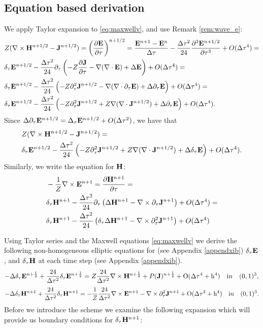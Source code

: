 \documentclass[12pt,reqno]{amsart}
\newcommand{\e}{{\bf E}}
\newcommand{\h}{{\bf H}}
\newcommand{\J}{{\bf J}}
\theoremstyle{definition}
\numberwithin{equation}{section}
\begin{document}
	\subsection{Equation based derivation}
	We apply Taylor expansion to \eqref{eq:maxwellv}, and use Remark \ref{rem:wave_e}:
	\begin{align*}
	&
	Z(\nabla \times \h^{n+1/2}-\J^{n+1/2})=	\left (  \frac{\partial \e}{\partial \tau} \right)^{n+1/2}=
		\frac{\e^{n+1} -\e^n}{\Delta \tau}-\frac{\Delta \tau^2}{24}\frac{\partial^3 \e^{n+1/2}}{\partial \tau^3}+O(\Delta \tau^4)=\\&
		\delta_{\tau}\e^{n+1/2}-\frac{\Delta \tau^2}{24}\partial_{\tau}
		\left(
		-Z\frac{\partial \J}{\partial \tau}-\nabla(\nabla \cdot \e)+\Delta \e
		\right)+O(\Delta \tau^4)=\\&
			\delta_{\tau}\e^{n+1/2}-\frac{\Delta \tau^2}{24}
		\left(
		-Z\partial_{\tau}^2\J^{n+1/2}
		-\nabla(\nabla\cdot\partial_\tau \e)+\Delta \partial_{\tau}\e
		\right)+O(\Delta \tau^4)=\\&
			\delta_{\tau}\e^{n+1/2}-\frac{\Delta \tau^2}{24}
		\left(
		-Z\partial_{\tau}^2\J^{n+1/2}
		+Z\nabla(\nabla\cdot\J^{n+1/2})+\Delta \partial_{\tau}\e
		\right)+O(\Delta \tau^4).
	\end{align*}
Since  $\Delta \partial_{\tau}\e^{n+1/2}=\Delta_{\tau} \e^{n+1/2}+O(\Delta \tau^2) $,
we have 
that 
\begin{align*}
	&
		Z(\nabla \times \h^{n+1/2}-\J^{n+1/2})=\\&
	\delta_{\tau}\e^{n+1/2}-\frac{\Delta \tau^2}{24}
\left(
-Z\partial_{\tau}^2\J^{n+1/2}
+Z\nabla(\nabla\cdot\J^{n+1/2})+\Delta \delta_{\tau}\e
\right)+O(\Delta \tau^4).
\end{align*}
Similarly, we write the equation for $\h$:
\begin{align*}
	& 
	-\frac{1}{Z}\nabla \times \e^{n+1}=\frac{\partial \h^{n+1}}{\partial \tau}=\\&
	\delta_\tau \h^{n+1}-\frac{\Delta \tau^2}{24}\partial_{\tau}\left ( 
\Delta \h^{n+1}-\nabla \times \partial_{\tau}\J^{n+1}
	\right)+O(\Delta \tau^4)=\\&
		\delta_\tau \h^{n+1}-\frac{\Delta \tau^2}{24}\left ( 
	\delta_{\tau}\Delta\h^{n+1}-\nabla \times \partial_{\tau}^2\J^{n+1}
	\right)+O(\Delta \tau^4)
\end{align*}
	
	Using  Taylor series and the Maxwell equations \eqref{eq:maxwellv} 
	we derive the following non-homogeneous elliptic equations for (see Appendix \ref{appendxib})
$	\delta_{\tau} \bf{E}$, and $\delta_{\tau} \bf{H}$
at each time step
(see Appendix \ref{appendxib}).
	$$
	-\Delta\delta_{\tau} \e^{n+\frac{1}{2}}+\frac{24}{\Delta \tau^2}\delta_{\tau}\e^{n+\frac{1}{2}}=
	Z\frac{24}{\Delta \tau^2}\nabla\times \h^{n+\frac{1}{2}}+P(\J)^{n+\frac{1}{2}}+
	\mathrm{O(\Delta \tau^4+h^4)} \quad {\mathrm in} \quad (0,1)^3,
	$$
		$$
	-\Delta \delta_{\tau}\h^{n+1}+\frac{24}{\Delta \tau^2}\delta_{\tau}\h^{n+1}=
	-\frac{1}{Z}\frac{24}{\Delta \tau^2}\nabla\times \e^{n+1}
	-\nabla\times\partial_{\tau}^2\J^{n+1}+
	\mathrm{O(\Delta \tau^4+h^4)} 
	\quad {\mathrm in} \quad (0,1)^3.
	$$
   Before we introduce the scheme we examine the following expansion which will provide us boundary conditions for $\delta_\tau \h^{n+1}$:
\end{document}
